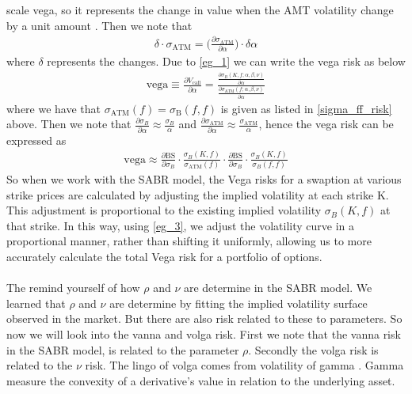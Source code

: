 scale vega, so it represents the change in value when the AMT volatility change by a unit amount \cite{Smile}.
Then we note that 
\begin{align}
    \delta  \cdot \sigma_{\text{ATM}} =
     \Big(\frac{\partial \sigma_{\text{ATM}}}{\partial \alpha} \Big) \cdot \delta \alpha \label{eg_1}
\end{align}
where $\delta$ represents the changes. Due to \autoref{eg_1} we can write the vega risk as below
\begin{align}
    \text{vega} \equiv  \frac{\partial V_{\text{call}}}{\partial \alpha} 
   = \frac{\frac{\partial \sigma_B(K, f; \alpha, \beta, \nu)}{\partial \alpha}}
    {\frac{\partial \sigma_{\text{ATM}}(f; \alpha, \beta, \nu)}{\partial \alpha}} \label{eg_3}
\end{align}
 where we have that $\sigma_{\text{ATM}}(f) = \sigma_{\text{B}} (f,f)$  is given as listed in \autoref{sigma_ff_risk}
 above. 
Then we note that  $\frac{\partial \sigma_B}{\partial \alpha} \approx \frac{ \sigma_B}{ \alpha}$ 
and $\frac{\partial \sigma_{\text{ATM}}}{\partial \alpha} \approx \frac{ \sigma_{\text{ATM}}}{\alpha}$,
hence the vega risk can be expressed as 
\begin{align}
\text{vega} \approx \frac{\partial \text{BS}}{\partial \sigma_B} \cdot
 \frac{\sigma_B(K,f)}{\sigma_{\text{ATM}}(f)} \cdot \frac{\partial \text{BS}}{\partial \sigma_B} 
 \cdot \frac{\sigma_B(K,f)}{\sigma_B(f,f)}
\end{align}
So when we work with the SABR model,
the Vega risks for a swaption at various strike prices are calculated by adjusting the implied volatility at each strike 
K. This adjustment is proportional to the existing implied volatility 
$\sigma_B(K,f)$
at that strike. In this way, using \autoref{eg_3}, we adjust the
volatility curve in a proportional manner, rather than shifting 
it uniformly, allowing us to more accurately calculate the total
Vega risk for a portfolio of options.
\\\\
The remind yourself of how $\rho$ and $\nu$ are determine in the SABR model.
We learned that $\rho$ and $\nu$ are determine by fitting the implied volatility
surface observed in the market. But there are also risk related to these 
to parameters. So now we will look into the vanna and volga risk. 
First we note that the vanna risk in the SABR model, is related 
to the  parameter $\rho$. Secondly the volga risk is related
to the $\nu$ risk. The lingo of volga comes from volatility of gamma
\cite{Smile}. Gamma measure the convexity of a derivative's value in relation to the underlying asset. 
